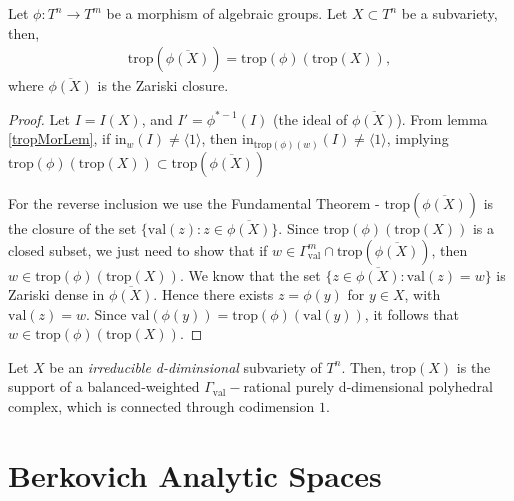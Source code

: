     \begin{corollary}
        \label{morphCor}
        Let $\phi: T^{n}\to T^{m}$ be a morphism of algebraic groups.
        Let $X\subset T^{n}$ be a subvariety, then,
        \begin{align*}
            \text{trop}(\overline{\phi(X)}) = \text{trop}(\phi)(\text{trop}(X)),
        \end{align*}
        where $\overline{\phi(X)}$ is the Zariski closure.
    \end{corollary}
    \begin{proof}
        Let $I = I(X)$, and $I' = \phi^{*-1}(I)$ (the ideal of $\overline{\phi(X)}$).
        From lemma \ref{tropMorLem}, if $\text{in}_{w}(I) \neq \langle 1 \rangle$, then $\text{in}_{\text{trop}(\phi)(w)}(I) \neq \langle 1 \rangle$, implying $\text{trop}(\phi)(\text{trop}(X)) \subset \text{trop}(\overline{\phi(X)})$
        \par For the reverse inclusion we use the Fundamental Theorem - 
        $\text{trop}(\overline{\phi(X)})$ is the closure of the set $\{ \text{val}(z): z \in \overline{\phi(X)}\}$.
        Since $\text{trop}(\phi)(\text{trop}(X))$ is a closed subset, we just need to show that if $w \in \Gamma_{\text{val}}^{m} \cap \text{trop}(\overline{\phi(X)})$, then $w \in \text{trop}(\phi)(\text{trop}(X))$.
        We know that the set $\{z \in \overline{\phi(X)}: \text{val}(z)=w\}$ is Zariski dense in $\overline{\phi(X)}$. 
        Hence there exists $z = \phi(y)$ for $y \in X$, with $\text{val}(z) = w$. 
        Since $\text{val}(\phi(y)) = \text{trop}(\phi)(\text{val}(y))$, it follows that $w \in \text{trop}(\phi)(\text{trop}(X))$.
    \end{proof}

    \begin{theorem}
        Let $X$ be an \textit{irreducible d-diminsional} subvariety of $T^{n}$. Then, trop$(X)$ is the support of a balanced-weighted $\Gamma_{\text{val}}-$rational purely d-dimensional polyhedral complex, which is connected through codimension $1$.
    \end{theorem}

\section{Berkovich Analytic Spaces}
